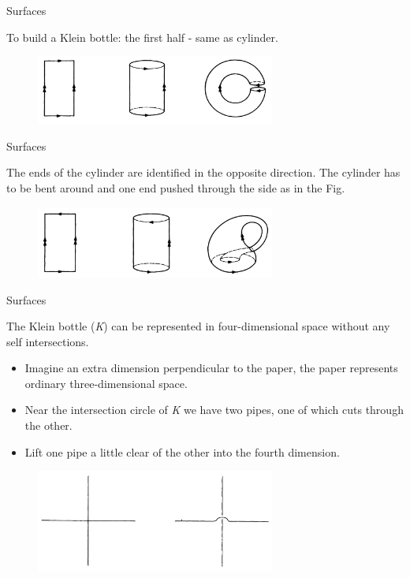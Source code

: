 \documentclass{beamer}
\begin{document}
\begin{frame}{Surfaces}
  \begin{block}{}
    To build a Klein bottle: the first half - same as cylinder.
  \end{block}
  \begin{figure}
    \centering
    \includegraphics[width=0.7\textwidth]{figure_1_11.png}
    \caption{}
  \end{figure}
\end{frame}

\begin{frame}{Surfaces}
  \begin{block}{}
    The ends of the cylinder are identified in the opposite direction. The cylinder has to be bent around and one end pushed through the side as in the Fig.
  \end{block}
  \begin{figure}
    \centering
    \includegraphics[width=0.7\textwidth]{figure_1_12.png}
    \caption{}
  \end{figure}
\end{frame}

\begin{frame}{Surfaces}
  \begin{block}{}
    The Klein bottle (\textsl{K}) can be represented in four-dimensional space without any self intersections.
    \begin{itemize}
    \item Imagine an extra dimension perpendicular to the paper, the paper represents ordinary three-dimensional space.
    \item Near the intersection circle of \textsl{K} we have two pipes, one of which cuts through the other.
    \item Lift one pipe a little clear of the other into the fourth dimension.
    \end{itemize}
  \end{block}
  \begin{figure}
    \centering
    \includegraphics[width=0.7\textwidth]{figure_1_13.png}
    \caption{}
  \end{figure}
\end{frame}
\end{document}
